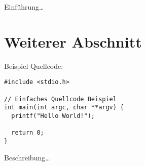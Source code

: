 
Einführung\ldots

\section{Weiterer Abschnitt}

Beispiel Quellcode:

\begin{lstlisting}[style=customCStyle,caption={[Die kurze Beschreibung]Die lange Beschreibung}]
#include <stdio.h>

// Einfaches Quellcode Beispiel
int main(int argc, char **argv) {
  printf("Hello World!");

  return 0;
}
\end{lstlisting}

Beschreibung\ldots
